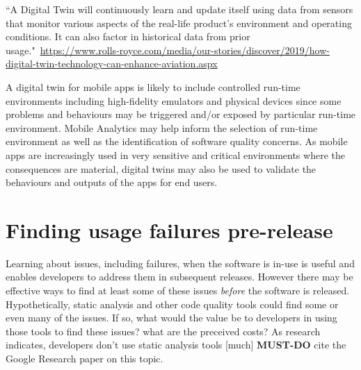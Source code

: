 ``A Digital Twin will continuously learn and update itself using data from sensors that monitor various aspects of the real-life product’s environment and operating conditions. It can also factor in historical data from prior usage."~\url{https://www.rolls-royce.com/media/our-stories/discover/2019/how-digital-twin-technology-can-enhance-aviation.aspx}

A digital twin for mobile apps is likely to include controlled run-time environments including high-fidelity emulators and physical devices since some problems and behaviours may be triggered and/or exposed by particular run-time environment. Mobile Analytics may help inform the selection of run-time environment as well as the identification of software quality concerns. As mobile apps are increasingly used in very sensitive and critical environments where the consequences are material, digital twins may also be used to validate the behaviours and outputs of the apps for end users.



\section{Finding usage failures pre-release}
Learning about issues, including failures, when the software is in-use is useful and enables developers to address them in subsequent releases. However there may be effective ways to find at least some of these issues \textit{before} the software is released. Hypothetically, static analysis and other code quality tools could find some or even many of the issues. If so, what would the value be to developers in using those tools to find these issues? what are the preceived costs? As research indicates, developers don't use static analysis tools [much] 
\textbf{MUST-DO} cite the Google Research paper on this topic.

